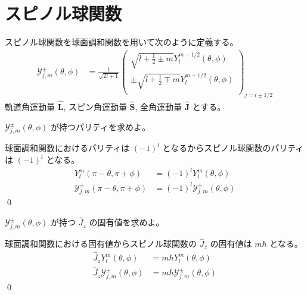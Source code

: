 \documentclass[uplatex,dvipdfmx,a4paper,11pt]{jlreq}
\makeatletter
\numberwithin{equation}{section}
\theoremstyle{definition}
\renewenvironment{proof}[1][\proofname]{\par
  \normalfont
  \topsep6\p@\@plus6\p@ \trivlist
  \item[\hskip\labelsep{\bfseries #1}\@addpunct{\bfseries}]\ignorespaces\quad\par
}{%
  \qed\endtrivlist\@endpefalse
}
\renewcommand\proofname{証明}
\makeatother
\begin{document}
\section{スピノル球関数}
\begin{problem}
スピノル球関数を球面調和関数を用いて次のように定義する。
\begin{align}
  \mathcal{Y}_{j, m}^\pm(\theta, \phi) & = \frac{1}{\sqrt{2l + 1}}\begin{pmatrix}
                                                                    \sqrt{l + \frac{1}{2} \pm m}Y_l^{m - 1/2}(\theta, \phi)    \\
                                                                    \pm\sqrt{l + \frac{1}{2} \mp m}Y_l^{m + 1/2}(\theta, \phi) \\
                                                                  \end{pmatrix}_{j = l\pm 1/2}
\end{align}
軌道角運動量 $\hat{\bm{L}}$, スピン角運動量 $\hat{\bm{S}}$, 全角運動量 $\hat{\bm{J}}$ とする。

$\mathcal{Y}_{j, m}^\pm(\theta, \phi)$ が持つパリティを求めよ。
\end{problem}
\begin{proof}
  球面調和関数におけるパリティは $(-1)^l$ となるからスピノル球関数のパリティは $(-1)^l$ となる。
  \begin{align}
    Y_l^m(\pi - \theta, \pi + \phi)                  & = (-1)^lY_l^m(\theta, \phi)                  \\
    \mathcal{Y}_{j, m}^\pm(\pi - \theta, \pi + \phi) & = (-1)^l\mathcal{Y}_{j, m}^\pm(\theta, \phi)
  \end{align}
\end{proof}

\begin{problem}
$\mathcal{Y}_{j, m}^\pm(\theta, \phi)$ が持つ $\hat{J}_z$ の固有値を求めよ。
\end{problem}
\begin{proof}
  球面調和関数における固有値からスピノル球関数の $\hat{J}_z$ の固有値は $m\hbar$ となる。
  \begin{align}
    \hat{J}_zY_l^m(\theta, \phi)                  & = m\hbar Y_l^m(\theta, \phi)                  \\
    \hat{J}_z\mathcal{Y}_{j, m}^\pm(\theta, \phi) & = m\hbar \mathcal{Y}_{j, m}^\pm(\theta, \phi)
  \end{align}
\end{proof}
\end{document}
